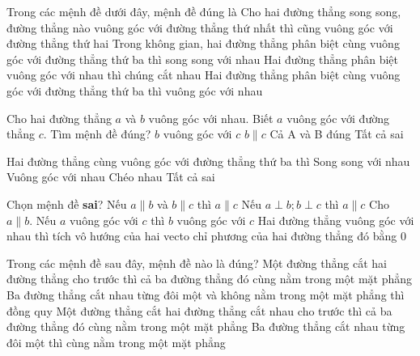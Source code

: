 \begin{ex}
	Trong các mệnh đề dưới đây, mệnh đề đúng là
	\choice
	{\True Cho hai đường thẳng song song, đường thẳng nào vuông góc với đường thẳng thứ nhất thì cũng vuông góc với đường thẳng thứ hai}
	{Trong không gian, hai đường thẳng phân biệt cùng vuông góc với đường thẳng thứ ba thì song song với nhau}
	{Hai đường thẳng phân biệt vuông góc với nhau thì chúng cắt nhau}
	{Hai đường thẳng phân biệt cùng vuông góc với đường thẳng thứ ba thì vuông góc với nhau}
\end{ex}

\begin{ex}
	Cho hai đường thẳng $a$ và $b$ vuông góc với nhau. Biết $a$ vuông góc với đường thẳng $c$. Tìm mệnh đề đúng?
	\choice
	{$b$ vuông góc với $c$}
	{$b \parallel c$}
	{Cả A và B đúng}
	{\True Tất cả sai}
\end{ex}
\begin{ex}
	Hai đường thẳng cùng vuông góc với đường thẳng thứ ba thì
	\choice
	{Song song với nhau}
	{Vuông góc với nhau}
	{Chéo nhau}
	{\True Tất cả sai}
\end{ex}
\begin{ex}
	Chọn mệnh đề \textbf{sai}?
	\choice
	{ Nếu $a \parallel b$ và $b \parallel c$ thì $a \parallel c$}
	{\True Nếu $a \perp b ; b \perp c$ thì $a \parallel c$}
	{Cho $a \parallel b$. Nếu $a$ vuông góc với $c$ thì $b$ vuông góc với $c$}
	{Hai đường thẳng vuông góc với nhau thì tích vô hướng của hai vecto chỉ phương của hai đường thẳng đó bằng $0$}
\end{ex}
\begin{ex}
	Trong các mệnh đề sau đây, mệnh đề nào là đúng?
	\choice
	{Một đường thẳng cắt hai đường thẳng cho trước thì cả ba đường thẳng đó cùng nằm trong một mặt phẳng}
	{\True Ba đường thẳng cắt nhau từng đôi một và không nằm trong một mặt phẳng thì đồng quy}
	{Một đường thẳng cắt hai đường thẳng cắt nhau cho trước thì cả ba đường thẳng đó cùng nằm trong một mặt phẳng}
	{Ba đường thẳng cắt nhau từng đôi một thì cùng nằm trong một mặt phẳng}
\end{ex}

